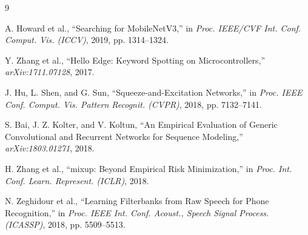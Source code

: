 \documentclass[10pt,a4paper,twoside]{article}
\begin{document}
\begin{thebibliography}{9}

	A. Howard et al., ``Searching for MobileNetV3,'' in \textit{Proc. IEEE/CVF Int. Conf. Comput. Vis. (ICCV)}, 2019, pp. 1314--1324.

	Y. Zhang et al., ``Hello Edge: Keyword Spotting on Microcontrollers,'' \textit{arXiv:1711.07128}, 2017.

	J. Hu, L. Shen, and G. Sun, ``Squeeze-and-Excitation Networks,'' in \textit{Proc. IEEE Conf. Comput. Vis. Pattern Recognit. (CVPR)}, 2018, pp. 7132--7141.

	S. Bai, J. Z. Kolter, and V. Koltun, ``An Empirical Evaluation of Generic Convolutional and Recurrent Networks for Sequence Modeling,'' \textit{arXiv:1803.01271}, 2018.

	H. Zhang et al., ``mixup: Beyond Empirical Risk Minimization,'' in \textit{Proc. Int. Conf. Learn. Represent. (ICLR)}, 2018.

	N. Zeghidour et al., ``Learning Filterbanks from Raw Speech for Phone Recognition,'' in \textit{Proc. IEEE Int. Conf. Acoust., Speech Signal Process. (ICASSP)}, 2018, pp. 5509--5513.

\end{thebibliography}
\end{document}
